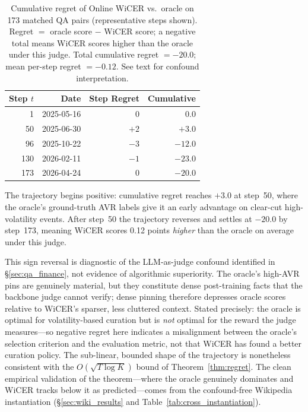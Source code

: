 \documentclass{article}
\begin{document}
\begin{table}[h]
\centering
\caption{Cumulative regret of Online WiCER vs.\ oracle on 173 matched QA pairs (representative steps shown). Regret $=$ oracle score $-$ WiCER score; a negative total means WiCER scores higher than the oracle under this judge. Total cumulative regret $= -20.0$; mean per-step regret $= -0.12$. See text for confound interpretation.}
\label{tab:regret_series}
\small
\begin{tabular}{@{}rrrr@{}}
\toprule
\textbf{Step $t$} & \textbf{Date} & \textbf{Step Regret} & \textbf{Cumulative} \\
\midrule
  1 & 2025-05-16 & $\phantom{+}0$ & $\phantom{+}0.0$ \\
 50 & 2025-06-30 & $+2$ & $+3.0$ \\
 96 & 2025-10-22 & $-3$ & $-12.0$ \\
130 & 2026-02-11 & $-1$ & $-23.0$ \\
173 & 2026-04-24 & $\phantom{+}0$ & $-20.0$ \\
\bottomrule
\end{tabular}
\end{table}

The trajectory begins positive: cumulative regret reaches $+3.0$ at step~50, where the oracle's ground-truth AVR labels give it an early advantage on clear-cut high-volatility events.
After step~50 the trajectory reverses and settles at $-20.0$ by step~173, meaning WiCER scores 0.12 points \emph{higher} than the oracle on average under this judge.

This sign reversal is diagnostic of the LLM-as-judge confound identified in \S\ref{sec:qa_finance}, not evidence of algorithmic superiority.
The oracle's high-AVR pins are genuinely material, but they constitute dense post-training facts that the backbone judge cannot verify; dense pinning therefore depresses oracle scores relative to WiCER's sparser, less cluttered context.
Stated precisely: the oracle is optimal for volatility-based curation but is \emph{not} optimal for the reward the judge measures---so negative regret here indicates a misalignment between the oracle's selection criterion and the evaluation metric, not that WiCER has found a better curation policy.
The sub-linear, bounded shape of the trajectory is nonetheless consistent with the $O(\sqrt{T \log K})$ bound of Theorem~\ref{thm:regret}.
The clean empirical validation of the theorem---where the oracle genuinely dominates and WiCER tracks below it as predicted---comes from the confound-free Wikipedia instantiation (\S\ref{sec:wiki_results} and Table~\ref{tab:cross_instantiation}).
\end{document}
